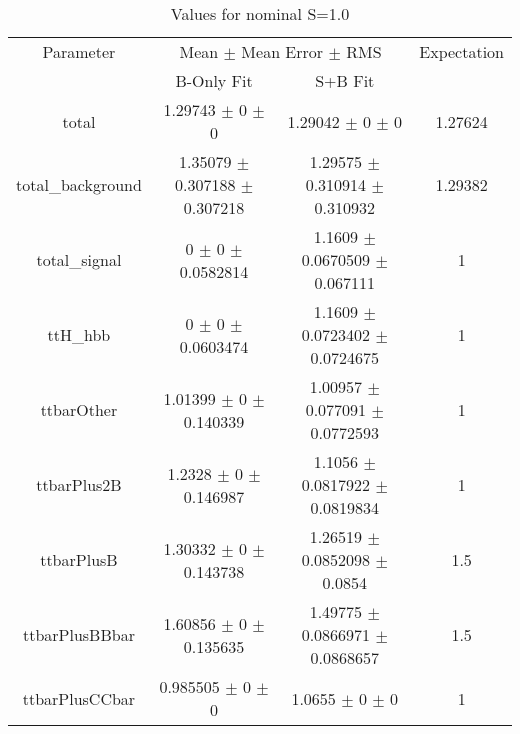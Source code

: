 \begin{table}
\centering
\caption{Values for nominal S=1.0}
\begin{tabular}{cccc}
\toprule
Parameter & \multicolumn{2}{c}{Mean $\pm$ Mean Error $\pm$ RMS} & Expectation\\
 & B-Only Fit & S+B Fit & \\
\midrule
total & \num{1.29743} $\pm$ \num{0} $\pm$ \num{0} & \num{1.29042} $\pm$ \num{0} $\pm$ \num{0} & \num{1.27624}\\
total\_background & \num{1.35079} $\pm$ \num{0.307188} $\pm$ \num{0.307218} & \num{1.29575} $\pm$ \num{0.310914} $\pm$ \num{0.310932} & \num{1.29382}\\
total\_signal & \num{0} $\pm$ \num{0} $\pm$ \num{0.0582814} & \num{1.1609} $\pm$ \num{0.0670509} $\pm$ \num{0.067111} & \num{1}\\
ttH\_hbb & \num{0} $\pm$ \num{0} $\pm$ \num{0.0603474} & \num{1.1609} $\pm$ \num{0.0723402} $\pm$ \num{0.0724675} & \num{1}\\
ttbarOther & \num{1.01399} $\pm$ \num{0} $\pm$ \num{0.140339} & \num{1.00957} $\pm$ \num{0.077091} $\pm$ \num{0.0772593} & \num{1}\\
ttbarPlus2B & \num{1.2328} $\pm$ \num{0} $\pm$ \num{0.146987} & \num{1.1056} $\pm$ \num{0.0817922} $\pm$ \num{0.0819834} & \num{1}\\
ttbarPlusB & \num{1.30332} $\pm$ \num{0} $\pm$ \num{0.143738} & \num{1.26519} $\pm$ \num{0.0852098} $\pm$ \num{0.0854} & \num{1.5}\\
ttbarPlusBBbar & \num{1.60856} $\pm$ \num{0} $\pm$ \num{0.135635} & \num{1.49775} $\pm$ \num{0.0866971} $\pm$ \num{0.0868657} & \num{1.5}\\
ttbarPlusCCbar & \num{0.985505} $\pm$ \num{0} $\pm$ \num{0} & \num{1.0655} $\pm$ \num{0} $\pm$ \num{0} & \num{1}\\
\bottomrule
\end{tabular}
\end{table}